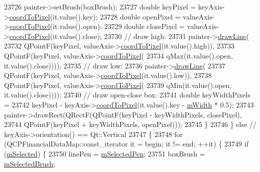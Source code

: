 \begin{DoxyCode}
23726       painter->setBrush(boxBrush);
23727       \textcolor{keywordtype}{double} keyPixel = keyAxis->\hyperlink{class_q_c_p_axis_a985ae693b842fb0422b4390fe36d299a}{coordToPixel}(it.value().key);
23728       \textcolor{keywordtype}{double} openPixel = valueAxis->\hyperlink{class_q_c_p_axis_a985ae693b842fb0422b4390fe36d299a}{coordToPixel}(it.value().open);
23729       \textcolor{keywordtype}{double} closePixel = valueAxis->\hyperlink{class_q_c_p_axis_a985ae693b842fb0422b4390fe36d299a}{coordToPixel}(it.value().close);
23730       \textcolor{comment}{// draw high:}
23731       painter->\hyperlink{class_q_c_p_painter_a0b4b1b9bd495e182c731774dc800e6e0}{drawLine}(
23732           QPointF(keyPixel, valueAxis->\hyperlink{class_q_c_p_axis_a985ae693b842fb0422b4390fe36d299a}{coordToPixel}(it.value().high)),
23733           QPointF(keyPixel, valueAxis->\hyperlink{class_q_c_p_axis_a985ae693b842fb0422b4390fe36d299a}{coordToPixel}(
23734                                 qMax(it.value().open, it.value().close))));
23735       \textcolor{comment}{// draw low:}
23736       painter->\hyperlink{class_q_c_p_painter_a0b4b1b9bd495e182c731774dc800e6e0}{drawLine}(
23737           QPointF(keyPixel, valueAxis->\hyperlink{class_q_c_p_axis_a985ae693b842fb0422b4390fe36d299a}{coordToPixel}(it.value().low)),
23738           QPointF(keyPixel, valueAxis->\hyperlink{class_q_c_p_axis_a985ae693b842fb0422b4390fe36d299a}{coordToPixel}(
23739                                 qMin(it.value().open, it.value().close))));
23740       \textcolor{comment}{// draw open-close box:}
23741       \textcolor{keywordtype}{double} keyWidthPixels =
23742           keyPixel - keyAxis->\hyperlink{class_q_c_p_axis_a985ae693b842fb0422b4390fe36d299a}{coordToPixel}(it.value().key - \hyperlink{class_q_c_p_financial_af630e5eb8485146b9c777e63fd1cf993}{mWidth} * 0.5);
23743       painter->drawRect(QRectF(QPointF(keyPixel - keyWidthPixels, closePixel),
23744                                QPointF(keyPixel + keyWidthPixels, openPixel)));
23745     \}
23746   \} \textcolor{keywordflow}{else} \textcolor{comment}{// keyAxis->orientation() == Qt::Vertical}
23747   \{
23748     \textcolor{keywordflow}{for} (QCPFinancialDataMap::const\_iterator it = begin; it != end; ++it) \{
23749       \textcolor{keywordflow}{if} (\hyperlink{class_q_c_p_abstract_plottable_a43f68a0603e9bcd016bdfa6d9d5c41c9}{mSelected}) \{
23750         linePen = \hyperlink{class_q_c_p_abstract_plottable_a10619472f5d5e10e9519a599f1cf5576}{mSelectedPen};
23751         boxBrush = \hyperlink{class_q_c_p_abstract_plottable_aea3c0da30c7a8be23ad5f2d9bca36762}{mSelectedBrush};

\end{DoxyCode}
